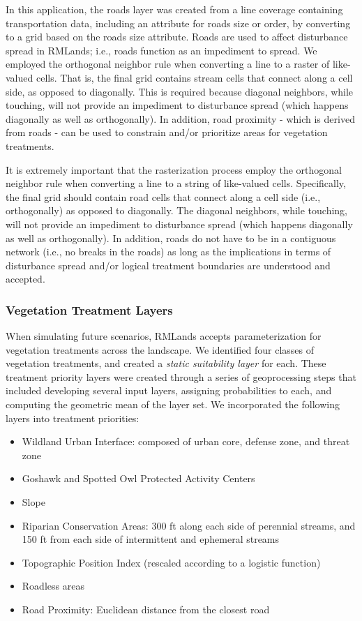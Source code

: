 In this application, the roads layer was created from a line coverage containing transportation data, including an attribute for roads size or order, by converting to a grid based on the roads size attribute. Roads are used to affect disturbance spread in RMLands; i.e., roads function as an impediment to spread. We employed the orthogonal neighbor rule when converting a line to a raster of like-valued cells. That is, the final grid contains stream cells that connect along a cell side, as opposed to diagonally. This is required because diagonal neighbors, while touching, will not provide an impediment to disturbance spread (which happens diagonally as well as orthogonally). In addition, road proximity - which is derived from roads - can be used to constrain and/or prioritize areas for vegetation treatments. 

It is extremely important that the rasterization process employ the orthogonal neighbor rule when converting a line to a string of like-valued cells. Specifically, the final grid should contain road cells that connect along a cell side (i.e., orthogonally) as opposed to diagonally. The diagonal neighbors, while touching, will not provide an impediment to disturbance spread (which happens diagonally as well as orthogonally). In addition, roads do not have to be in a contiguous network (i.e., no breaks in the roads) as long as the implications in terms of disturbance spread and/or logical treatment boundaries are understood and accepted. 


\subsubsection{Vegetation Treatment Layers}

When simulating future scenarios, RMLands accepts parameterization for vegetation treatments across the landscape. We identified four classes of vegetation treatments, and created a \emph{static suitability layer} for each. These treatment priority layers were created through a series of geoprocessing steps that included developing several input layers, assigning probabilities to each, and computing the geometric mean of the layer set. We incorporated the following layers into treatment priorities:
\begin{itemize}
	\item Wildland Urban Interface: composed of urban core, defense zone, and threat zone
	\item Goshawk and Spotted Owl Protected Activity Centers
	\item Slope
	\item Riparian Conservation Areas: 300 ft along each side of perennial streams, and 150 ft from each side of intermittent and ephemeral streams
	\item Topographic Position Index (rescaled according to a logistic function)
	\item Roadless areas
	\item Road Proximity: Euclidean distance from the closest road
\end{itemize}

